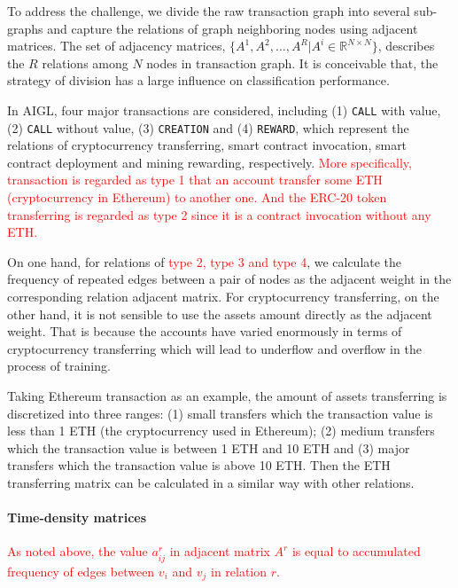 To address the challenge, we divide the raw transaction graph into several sub-graphs and capture the relations of graph neighboring nodes using adjacent matrices. The set of adjacency matrices, $\{A^1,A^2,\dots,A^R|A^i\in \mathbb{R}^{N \times N}\}$, describes the $R$ relations among $N$ nodes in transaction graph. It is conceivable that, the strategy of division has a large influence on classification performance.

In AIGL, four major transactions are considered, including (1) \texttt{CALL} with value, (2) \texttt{CALL} without value, (3) \texttt{CREATION} and (4) \texttt{REWARD}, which represent the relations of cryptocurrency transferring, smart contract invocation, smart contract deployment and mining rewarding, respectively. \textcolor{red}{More specifically, transaction is regarded as type 1 that an account transfer some ETH (cryptocurrency in Ethereum) to another one. And the ERC-20 token transferring is regarded as type 2 since it is a contract invocation without any ETH.}

On one hand, for relations of \textcolor{red}{type 2, type 3 and type 4}, we calculate the frequency of repeated edges between a pair of nodes as the adjacent weight in the corresponding relation adjacent matrix. For cryptocurrency transferring, on the other hand, it is not sensible to use the assets amount directly as the adjacent weight. That is because the accounts have varied enormously in terms of cryptocurrency transferring which will lead to underflow and overflow in the process of training.

 Taking Ethereum transaction as an example, the amount of assets transferring is discretized into three ranges: (1) small transfers which the transaction value is less than 1 ETH (the cryptocurrency used in Ethereum); (2) medium transfers which the transaction value is between 1 ETH and 10 ETH and (3) major transfers which the transaction value is above 10 ETH. Then the ETH transferring matrix can be calculated in a similar way with other relations.



\paragraph{Time-density matrices}
\textcolor{red}{As noted above, the value $a^r_{ij}$ in adjacent matrix $A^r$ is equal to accumulated frequency of edges between $v_i$ and $v_j$ in relation $r$. }

